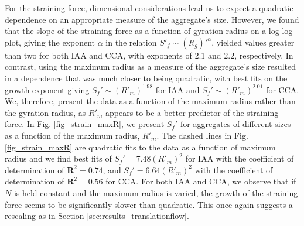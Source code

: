 For the straining force, dimensional considerations lead us to expect a quadratic dependence on an appropriate measure of the aggregate's size. However, we found that the slope of the straining force as a function of gyration radius on a log-log plot, giving the exponent $\alpha$ in the relation $S'_f \sim (R_g)'^{\alpha}$, yielded values greater than two for both IAA and CCA, with exponents of 2.1 and 2.2, respectively. In contrast, using the maximum radius as a measure of the aggregate's size resulted in a dependence that was much closer to being quadratic, with best fits on the growth exponent giving $S_f' \sim (R'_m)^{1.98}$ for IAA and $S_f' \sim (R'_m)^{2.01}$ for CCA. 
We, therefore, present the data as a function of the maximum radius rather than the gyration radius, as $R'_m$ appears to be a better predictor of the straining force.
In Fig. \ref{fig_strain_maxR}, we present $S_f'$ for aggregates 
of different sizes as a function of the maximum 
radius, $R'_m$. 
The dashed lines in  Fig. \ref{fig_strain_maxR}  are quadratic fits to the data as a function of maximum radius and we find best fits of $S_f' = 7.48 (R'_m)^2$ for IAA with the coefficient of determination of $\mathbf{R}^2=0.74$, and $S_f' = 6.64 (R'_m)^2$ with the coefficient of determination of $\mathbf{R}^2=0.56$ for CCA. For both IAA and CCA, we observe that if $N$ is held constant and the maximum radius is varied, the growth of the straining force seems to be significantly slower than quadratic. This once again suggests a rescaling as in Section \ref{sec:results_translationflow}. 

